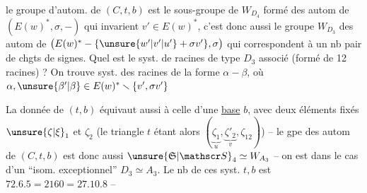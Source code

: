 le groupe d'autom. de $(C,t,b)$ est le sous-groupe de $W_{D_4}$ formé des autom de $(E(w)^*,\sigma,-)$ qui invarient $v'\in E(w)^*$, c'est donc aussi le groupe $W_{D_3}$ des autom de $\bigl(E(w)^*-\{\unsure{w'|v'|u'}+ \sigma v'\},\sigma\bigr)$ qui correspondent à un nb pair de chgts de signes. Quel est le syst. de racines de type $D_3$ associé (formé de 12 racines) ? On trouve  syst. des racines de la forme $\alpha-\beta$, où $\alpha,\unsure{\beta'|\beta}\in E(w)^*\smallsetminus\{v',\sigma v'\}$ 

La donnée de $(t,b)$ équivaut aussi à celle d'une \uline{base} $b$, avec deux éléments fixés $\unsure{\zeta|\xi}_1$ et $\zeta_2$ (le triangle $t$ étant alors $(\underset{u}{\underbrace{\zeta_1}},\underset{v}{\underbrace{\zeta'_2}},\zeta_{12})$) -- le gpe des autom de $(C,t,b)$ est donc aussi $\unsure{\mathfrak S|\mathscr S}_4\simeq W_{A_3}$ -- on est dans le cas d'un ``isom. exceptionnel'' $D_3\simeq A_3$. Le nb de ces syst. $t,b$ est $72.6.5=2160=27.10.8$ --
